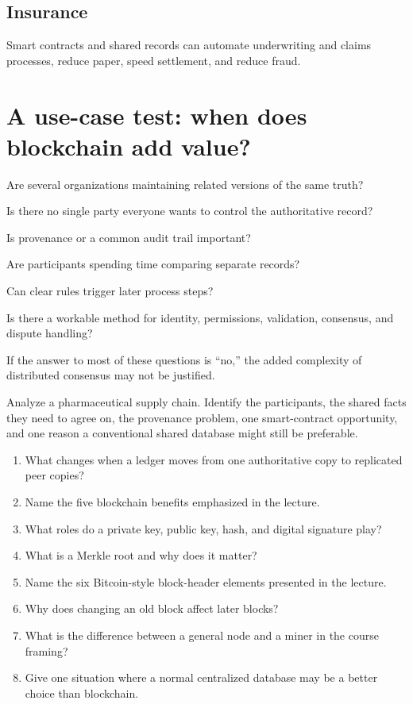 \subsection{Insurance}

Smart contracts and shared records can automate underwriting and claims processes, reduce paper, speed settlement, and reduce fraud.

\section{A use-case test: when does blockchain add value?}

\begin{utpsteps}
  \item {} Are several organizations maintaining related versions of the same truth?
  \item {} Is there no single party everyone wants to control the authoritative record?
  \item {} Is provenance or a common audit trail important?
  \item {} Are participants spending time comparing separate records?
  \item {} Can clear rules trigger later process steps?
  \item {} Is there a workable method for identity, permissions, validation, consensus, and dispute handling?
\end{utpsteps}

If the answer to most of these questions is ``no,'' the added complexity of distributed consensus may not be justified.

\begin{tryit}
Analyze a pharmaceutical supply chain. Identify the participants, the shared facts they need to agree on, the provenance problem, one smart-contract opportunity, and one reason a conventional shared database might still be preferable.
\end{tryit}

\begin{quickcheck}
\begin{enumerate}
  \item What changes when a ledger moves from one authoritative copy to replicated peer copies?
  \item Name the five blockchain benefits emphasized in the lecture.
  \item What roles do a private key, public key, hash, and digital signature play?
  \item What is a Merkle root and why does it matter?
  \item Name the six Bitcoin-style block-header elements presented in the lecture.
  \item Why does changing an old block affect later blocks?
  \item What is the difference between a general node and a miner in the course framing?
  \item Give one situation where a normal centralized database may be a better choice than blockchain.
\end{enumerate}
\end{quickcheck}
